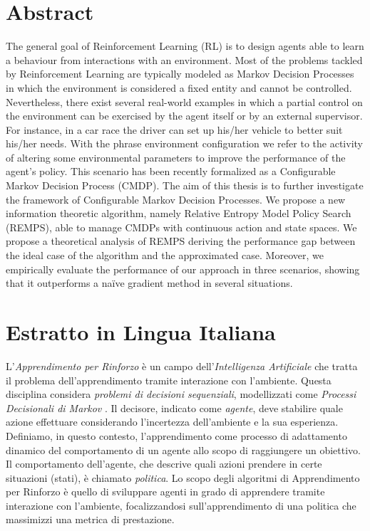 \newpage
\chapter*{Abstract}


The general goal of Reinforcement Learning (RL) is to design agents able to learn a behaviour from interactions with an environment.
Most of the problems tackled by Reinforcement Learning are typically modeled as Markov Decision Processes in which the environment is considered a fixed entity and cannot be controlled. Nevertheless, there exist several real-world examples in which a partial control on the environment can be exercised by the agent itself or by an external supervisor. For instance, in a car race the driver can set up his/her vehicle to better suit his/her needs. With the phrase environment configuration we refer to the activity of altering some environmental parameters to improve the performance of the agent's policy. This scenario has been recently formalized as a Configurable Markov Decision Process (CMDP). \newline
 The aim of this thesis is to further investigate the framework of Configurable Markov Decision Processes. We propose a new information theoretic algorithm, namely Relative Entropy Model Policy Search (REMPS), able to manage CMDPs with continuous action and state spaces. \newline
We propose a theoretical analysis of REMPS deriving the performance gap between the ideal case of the algorithm and the approximated case. Moreover, we empirically evaluate the performance of our approach in three scenarios, showing that it outperforms a naïve gradient method in several situations.

\chapter*{Estratto in Lingua Italiana}
L'\textit{Apprendimento per Rinforzo} \citep{sutton_introduction} è un campo dell'\textit{Intelligenza Artificiale} che tratta il problema dell'apprendimento tramite interazione con l'ambiente.
Questa disciplina considera \textit{problemi di decisioni sequenziali}, modellizzati come \textit{Processi Decisionali di Markov} \citep{Puterman:1994:MDP:528623}.
Il decisore, indicato come \textit{agente}, deve stabilire quale azione effettuare considerando l'incertezza dell'ambiente e la sua esperienza. 
Definiamo, in questo contesto, l'apprendimento come processo di adattamento dinamico del comportamento di un agente allo scopo di raggiungere un obiettivo.
Il comportamento dell'agente, che descrive quali azioni prendere in certe situazioni (stati), è chiamato \textit{politica}. Lo scopo degli algoritmi di Apprendimento per Rinforzo è quello di sviluppare agenti in grado di apprendere tramite interazione con l'ambiente, focalizzandosi sull'apprendimento di una politica che massimizzi una metrica di prestazione.
